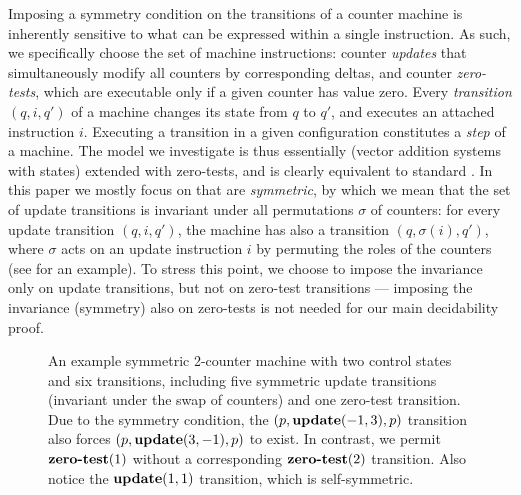 Imposing a symmetry condition on the transitions of a counter
machine is inherently sensitive to what can be expressed
within a single instruction.
As such, we specifically choose the set of machine instructions:
counter \emph{updates} that simultaneously modify all counters  
by corresponding deltas, and counter \emph{zero-tests}, which are 
executable only if a given counter has value zero.
Every \emph{transition} $(q,i,q')$ of a machine changes its state
from $q$ to $q'$,
and executes an attached instruction $i$.
Executing a transition in a given configuration constitutes a 
\emph{step} of a machine.
The model we investigate is thus essentially \vass
(vector addition systems with states) \cite{HopcroftPansiot}
extended with zero-tests, and
is clearly equivalent to standard . %
In this paper we mostly focus on  %
that are 
\emph{symmetric}, by which we mean that the set of update transitions
is invariant under all permutations $\sigma$ of counters:
for every update transition $(q,i,q')$, the machine has also a transition
$(q,\sigma(i), q')$, where $\sigma$ acts on an update instruction $i$
by permuting the roles of the counters
(see  for an example).
To stress this point, we choose to impose the invariance only on update transitions,
but not on zero-test transitions ---
imposing the invariance (symmetry) 
also on zero-tests is not needed for our main 
decidability proof.

\begin{figure}[h]
    \centering
\scalebox{0.6}
{}
\caption{
    An example symmetric 2-counter machine with two control states and
    six transitions, including five symmetric update transitions
    (invariant under the swap of counters) and one zero-test transition.
    Due to the symmetry condition, \eg the $(p, \textbf{update}(-1, 3), p)$ transition
    also forces $(p, \textbf{update}(3, -1), p)$ to exist. In contrast, we permit
    $\textbf{zero-test}(1)$ without a corresponding $\textbf{zero-test}(2)$ transition.
    Also notice the $\textbf{update}(1,1)$ transition, which is self-symmetric.
}
\label{fig:example}
\end{figure}

